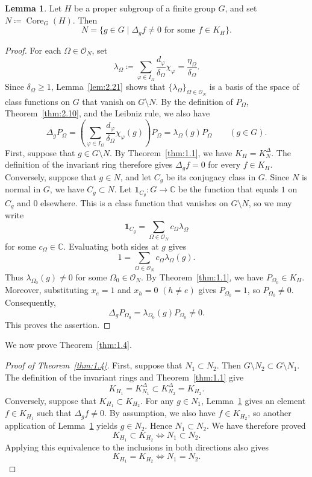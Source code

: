 \documentclass[12pt,a4paper]{article}
\theoremstyle{definition}
\newtheorem{lem}[definition]{Lemma}
\numberwithin{definition}{section}
\DeclareMathOperator{\Core}{Core}
\begin{document}
\begin{lem}\label{lem:4.1}
Let $H$ be a proper subgroup of a finite group $G$, and set
$N \coloneqq \Core_G(H)$.
Then
\[
N
=
\{g\in G\mid
  \Delta_g f\ne0 \text{ for some } f\in K_H\}.
\]
\end{lem}
\begin{proof}
For each $\Omega\in\mathcal O_N$, set
\[
\lambda_\Omega
\coloneqq
\sum_{\varphi\in I_\Omega}
\frac{d_\varphi}{\delta_\Omega}\chi_\varphi
=
\frac{\eta_\Omega}{\delta_\Omega}.
\]
Since $\delta_\Omega\geq1$, Lemma~\ref{lem:2.21} shows that
$\{\lambda_\Omega\}_{\Omega\in\mathcal O_N}$ is a basis of the space of
class functions on $G$ that vanish on $G\setminus N$.
By the definition of $P_\Omega$, Theorem~\ref{thm:2.10},
and the Leibniz rule, we also have
\[
\Delta_gP_\Omega
=
\left(
\sum_{\varphi\in I_\Omega}
\frac{d_\varphi}{\delta_\Omega}\chi_\varphi(g)
\right)P_\Omega
=
\lambda_\Omega(g)P_\Omega
\qquad(g\in G).
\]
First, suppose that $g\in G\setminus N$.
By Theorem~\ref{thm:1.1}, we have $K_H=K_N^\Delta$.
The definition of the invariant ring therefore gives
$\Delta_g f=0$ for every $f\in K_H$.
Conversely, suppose that $g\in N$, and let $C_g$ be its conjugacy class in $G$.
Since $N$ is normal in $G$, we have $C_g\subset N$.
Let $\mathbf 1_{C_g}\colon G\to\mathbb C$ be the function that equals $1$
on $C_g$ and $0$ elsewhere.
This is a class function that vanishes on $G\setminus N$, so we may write
\[
\mathbf 1_{C_g}
=
\sum_{\Omega\in\mathcal O_N}c_\Omega\lambda_\Omega
\]
for some $c_\Omega\in\mathbb C$.
Evaluating both sides at $g$ gives
\[
1
=
\sum_{\Omega\in\mathcal O_N}c_\Omega\lambda_\Omega(g).
\]
Thus $\lambda_{\Omega_0}(g)\ne0$ for some $\Omega_0\in\mathcal O_N$.
By Theorem~\ref{thm:1.1}, we have $P_{\Omega_0}\in K_H$.
Moreover, substituting $x_e=1$ and $x_h=0$ $(h\ne e)$ gives
$P_{\Omega_0}=1$, so $P_{\Omega_0}\ne0$.
Consequently,
\[
\Delta_gP_{\Omega_0}
=
\lambda_{\Omega_0}(g)P_{\Omega_0}
\ne0.
\]
This proves the assertion.
\end{proof}

We now prove Theorem~\ref{thm:1.4}.

\begin{proof}[Proof of Theorem~\ref{thm:1.4}]
First, suppose that $N_1\subset N_2$.
Then $G\setminus N_2\subset G\setminus N_1$.
The definition of the invariant rings and Theorem~\ref{thm:1.1} give
\[
K_{H_1}
=
K_{N_1}^\Delta
\subset
K_{N_2}^\Delta
=
K_{H_2}.
\]
Conversely, suppose that $K_{H_1}\subset K_{H_2}$.
For any $g\in N_1$, Lemma~\ref{lem:4.1} gives an element $f\in K_{H_1}$
such that $\Delta_g f\ne0$.
By assumption, we also have $f\in K_{H_2}$, so another application of
Lemma~\ref{lem:4.1} yields $g\in N_2$.
Hence $N_1\subset N_2$.
We have therefore proved
\[
K_{H_1}\subset K_{H_2}
\iff
N_1\subset N_2.
\]
Applying this equivalence to the inclusions in both directions also gives
\[
K_{H_1}=K_{H_2}
\iff
N_1=N_2.
\]
\end{proof}
\end{document}
